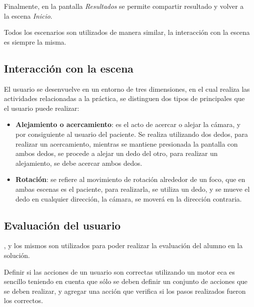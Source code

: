 Finalmente, en la pantalla \emph{Resultados} se permite compartir resultado y
volver a la escena \emph{Inicio}.

Todos los escenarios son utilizados de manera similar, la interacción con la
escena es siempre la misma.

\subsection{Interacción con la escena}

El usuario se desenvuelve en un entorno de tres dimensiones, en el cual realiza
las actividades relacionadas a la práctica, se distinguen dos tipos de
 principales que el usuario puede realizar:

\begin{itemize}
    \item \textbf{Alejamiento o acercamiento}: es el acto de acercar o alejar la
        cámara, y por consiguiente al usuario del paciente. Se realiza
        utilizando dos dedos, para realizar un acercamiento, mientras se
        mantiene presionada la pantalla con ambos dedos, se procede a alejar un
        dedo del otro, para realizar un alejamiento, se debe acercar ambos
        dedos.
    \item \textbf{Rotación}: se refiere al movimiento de rotación alrededor de
        un foco, que en ambas escenas es el paciente, para realizarla, se utiliza
        un dedo, y se mueve el dedo en cualquier dirección, la cámara, se moverá
        en la dirección contraria.
\end{itemize}

\subsection{Evaluación del usuario}
\label{sec:eca_impl}


, y los mismos son utilizados para poder realizar la evaluación
del alumno en la solución.

Definir si las acciones de un usuario son correctas utilizando un motor
\Gls{eca} es sencillo teniendo en cuenta que sólo se deben definir un
conjunto de acciones que se deben realizar, y agregar una acción que verifica si
los pasos realizados fueron los correctos.

